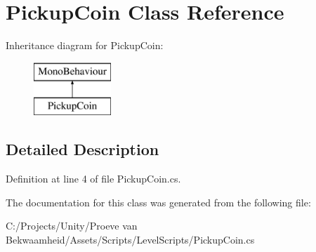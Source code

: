 \hypertarget{class_pickup_coin}{\section{Pickup\+Coin Class Reference}
\label{class_pickup_coin}
}
Inheritance diagram for Pickup\+Coin\+:\begin{figure}[H]
\begin{center}
\leavevmode
\includegraphics[height=2.000000cm]{class_pickup_coin}
\end{center}
\end{figure}


\subsection{Detailed Description}


Definition at line 4 of file Pickup\+Coin.\+cs.



The documentation for this class was generated from the following file\+:\begin{DoxyCompactItemize}
\item 
C\+:/\+Projects/\+Unity/\+Proeve van Bekwaamheid/\+Assets/\+Scripts/\+Level\+Scripts/Pickup\+Coin.\+cs\end{DoxyCompactItemize}

